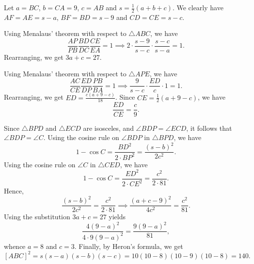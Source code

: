 \begin{center}
\end{center}

Let $a = BC$, $b = CA = 9$, $c = AB$ and $s = \frac12 (a + b + c)$. We clearly have $AF = AE = s-a$, $BF = BD = s-9$ and $CD = CE = s-c$.

Using Menalaus' theorem with respect to $\triangle ABC$, we have \[\frac{AP}{PB} \frac{BD}{DC} \frac{CE}{EA} = 1 \implies 2 \cdot \frac{s-9}{s-c} \cdot \frac{s-c}{s-a} = 1.\] Rearranging, we get $3a + c = 27$.

Using Menalaus' theorem with respect to $\triangle APE$, we have \[\frac{AC}{CE} \frac{ED}{DP} \frac{PB}{BA} = 1 \implies \frac{9}{s-c}\cdot \frac{ED}{c} \cdot 1 = 1.\] Rearranging, we get $ED = \frac{c(a + 9 - c)}{18}$. Since $CE = \frac12 (a + 9 - c)$, we have \[\frac{ED}{CE} = \frac{c}{9}.\]

Since $\triangle BPD$ and $\triangle ECD$ are isosceles, and $\angle BDP = \angle ECD$, it follows that $\angle BDP = \angle C$. Using the cosine rule on $\angle BDP$ in $\triangle BPD$, we have \[1 - \cos C = \frac{BD^2}{2 \cdot BP^2} = \frac{(s-b)^2}{2c^2}.\] Using the cosine rule on $\angle C$ in $\triangle CED$, we have \[1 - \cos C = \frac{ED^2}{2 \cdot CE^2} = \frac{c^2}{2 \cdot 81}.\] Hence, \[\frac{(s-b)^2}{2c^2} = \frac{c^2}{2 \cdot 81} \implies \frac{(a + c - 9)^2}{4c^2} = \frac{c^2}{81}.\] Using the substitution $3a + c = 27$ yields \[\frac{4(9-a)^2}{4 \cdot 9(9-a)^2} = \frac{9(9-a)^2}{81},\] whence $a = 8$ and $c = 3$. Finally, by Heron's formula, we get \[[ABC]^2 = s(s-a)(s-b)(s-c) = 10(10-8)(10-9)(10-8) = 140.\]


